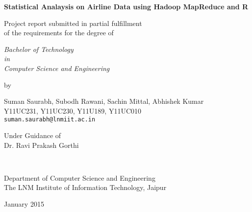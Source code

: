 \thispagestyle{empty}
\begin{center}
{\Large \bf Statistical Analaysis on Airline Data using Hadoop MapReduce and R}

\vspace*{1.75cm}
{\large Project report submitted in partial fulfillment\\}
{\large  of the requirements for the degree of \\}

\vspace*{1cm}
{\it {\large Bachelor of Technology} \\
{\large in\\}
{\large Computer Science and Engineering \\}}

\vspace*{1cm}
{\large by}

\vspace*{5mm}
{\large Suman Saurabh, Subodh Rawani, Sachin Mittal, Abhishek Kumar\\}
{\large Y11UC231, Y11UC230, Y11U189, Y11UC010\\
{\small \tt suman.saurabh@lnmiit.ac.in }}


\vspace*{5mm}
{\large Under Guidance of \\}
{\large Dr. Ravi Prakash Gorthi \\}

\vspace*{1.0cm}
{\\}

\vspace*{2.0cm}
{\large Department of Computer Science and Engineering \\}
{\large The LNM Institute of Information Technology, Jaipur\\}

\vspace*{1.0cm}
{\large January 2015\\}
\end{center}

